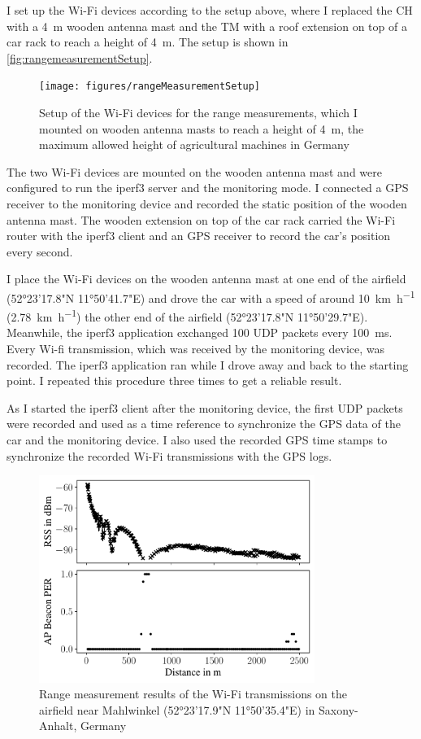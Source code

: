 I set up the Wi-Fi devices according to the setup above, where I replaced the \ac{CH} with a \SI{4}{\metre} wooden antenna mast and
the \ac{TM} with a roof extension on top of a car rack to reach a height of \SI{4}{\metre}.
The setup is shown in \autoref{fig:rangemeasurementSetup}.

\begin{figure}[]%
   \centering
   \texttt{[image: figures/rangeMeasurementSetup]}
   \caption{Setup of the Wi-Fi devices for the range measurements, which I mounted on wooden antenna masts to reach a height of \SI{4}{\metre}, the
   maximum allowed height of agricultural machines in Germany}
   \label{fig:rangemeasurementSetup}%
\end{figure}
The two Wi-Fi devices are mounted on the wooden antenna mast and were configured to run the iperf3 server and the monitoring mode.
I connected a \ac{GPS} receiver to the monitoring device and recorded the static position of the wooden antenna mast.
The wooden extension on top of the car rack carried the Wi-Fi router with the iperf3 client and an \ac{GPS} receiver to record the car's position every
second.

I place the Wi-Fi devices on the wooden antenna mast at one end of the airfield (52°23'17.8"N 11°50'41.7"E)
and drove the car with a speed of around \SI{10}{\kilo\metre\per\hour} (\SI{2.78}{\kilo\metre\per\hour}) the other end
of the airfield (52°23'17.8"N 11°50'29.7"E). Meanwhile, the iperf3 application exchanged \SI{100}{\byte} \ac{UDP} packets every
\SI{100}{\milli\second}.
Every Wi-fi transmission, which was received by the monitoring device, was recorded.
The iperf3 application ran while I drove away and back to the starting point.
I repeated this procedure three times to get a reliable result.

As I started the iperf3 client after the monitoring device, the first \ac{UDP} packets were recorded and used as a time reference to
synchronize the \ac{GPS} data of the car and the monitoring device.
I also used the recorded GPS time stamps to synchronize the recorded Wi-Fi transmissions with the \ac{GPS} logs.

\begin{figure}[]%
   \centering
   \includegraphics[width=0.8\textwidth]{figures/rangeMeasurementResults2}
   \caption{Range measurement results of the Wi-Fi transmissions on the airfield near Mahlwinkel (52°23'17.9"N 11°50'35.4"E) in Saxony-Anhalt, Germany}
   \label{fig:rangemeasurementResults}%
\end{figure}

